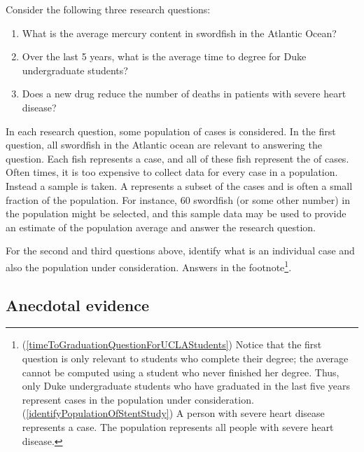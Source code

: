 Consider the following three research questions:
\begin{enumerate}
\setlength{\itemsep}{0mm}
\item What is the average mercury content in swordfish in the Atlantic Ocean?
\item\label{timeToGraduationQuestionForUCLAStudents} Over the last 5 years, what is the average time to degree for Duke undergraduate students?
\item\label{identifyPopulationOfStentStudy} Does a new drug reduce the number of deaths in patients with severe heart disease?
\end{enumerate}
In each research question, some population of cases is considered. In the first question, all swordfish in the Atlantic ocean are relevant to answering the question. Each fish represents a case, and all of these fish represent the  of cases. Often times, it is too expensive to collect data for every case in a population. Instead a sample is taken. A  represents a subset of the cases and is often a small fraction of the population. For instance, 60 swordfish (or some other number) in the population might be selected, and this sample data may be used to provide an estimate of the population average and answer the research question.

\begin{exercise} \label{identifyingThePopulationForTwoQuestionsInPopAndSampSubsection}
For the second and third questions above, identify what is an individual case and also the population under consideration. Answers in the footnote\footnote{(\ref{timeToGraduationQuestionForUCLAStudents}) Notice that the first question is only relevant to students who complete their degree; the average cannot be computed using a student who never finished her degree. Thus, only Duke undergraduate students who have graduated in the last five years represent cases in the population under consideration. (\ref{identifyPopulationOfStentStudy}) A person with severe heart disease represents a case. The population represents all people with severe heart disease.}.
\end{exercise}


\subsection{Anecdotal evidence}

